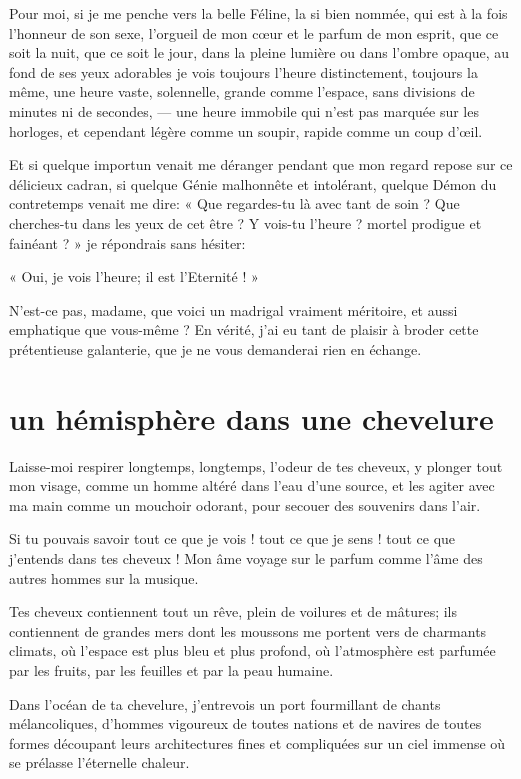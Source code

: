 Pour moi, si je me penche vers la belle Féline, la si bien nommée, qui
est à la fois l’honneur de son sexe,
l’orgueil de mon c\oe ur et le parfum de mon esprit, que
ce soit la nuit, que ce soit le jour, dans la pleine lumière ou dans
l’ombre opaque, au fond de ses yeux adorables je vois
toujours l’heure distinctement, toujours la même, une
heure vaste, solennelle, grande comme l’espace, sans
divisions de minutes ni de secondes, --- une heure immobile qui
n’est pas marquée sur les horloges, et cependant
légère comme un soupir, rapide comme un coup d’\oe il.

Et si quelque importun venait me déranger pendant que mon regard repose
sur ce délicieux cadran, si quelque Génie malhonnête et intolérant,
quelque Démon du contretemps venait me dire: « Que regardes{}-tu là
avec tant de soin ? Que cherches{}-tu dans les yeux de cet être ? Y
vois{}-tu l’heure ? mortel prodigue et fainéant ? » je
répondrais sans hésiter:

« Oui, je vois l’heure; il est
l’Eternité ! »

N’est{}-ce pas, madame, que voici un madrigal vraiment
méritoire, et aussi emphatique que vous{}-même ? En vérité,
j’ai eu tant de plaisir à broder cette prétentieuse
galanterie, que je ne vous demanderai rien en échange.

\quebra\section[Un hémisphère dans une chevelure]{un hémisphère dans une chevelure }

Laisse{}-moi respirer longtemps, longtemps, l’odeur de
tes cheveux, y plonger tout mon visage, comme un homme altéré dans
l’eau d’une source, et les agiter
avec ma main comme un mouchoir odorant, pour secouer des souvenirs dans
l’air.

Si tu pouvais savoir tout ce que je vois ! tout ce que je sens ! tout ce
que j’entends dans tes cheveux ! Mon âme voyage sur le
parfum comme l’âme des autres hommes sur la musique.

Tes cheveux contiennent tout un rêve, plein de voilures et de mâtures;
ils contiennent de grandes mers dont les moussons me portent vers de
charmants climats, où l’espace est plus bleu et plus
profond, où l’atmosphère est parfumée par les fruits,
par les feuilles et par la peau humaine.

Dans l’océan de ta chevelure,
j’entrevois un port fourmillant de chants
mélancoliques, d’hommes vigoureux de toutes nations et
de navires de toutes formes découpant leurs architectures fines et
compliquées sur un ciel immense où se prélasse
l’éternelle chaleur.

